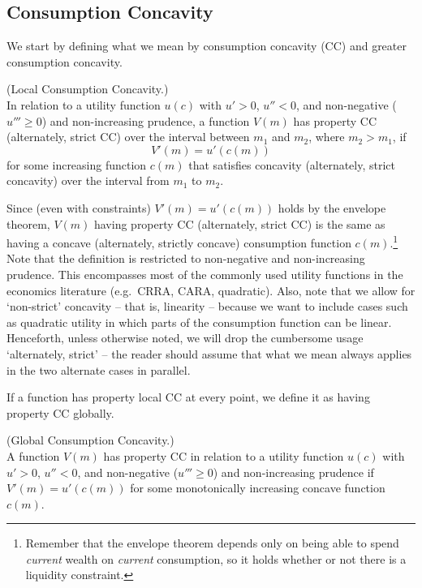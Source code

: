 
  \subsection{Consumption Concavity}\label{sec:def_CC}
  We start by defining what we mean by consumption concavity (CC) and greater consumption concavity.

  \begin{defn}\label{defn:IntervalStrictCC} (Local Consumption Concavity.) \\ In relation to a
    utility function $u(c)$ with $u'>0$, $u''<0$, and non-negative ($u''' \geq 0$) and non-increasing prudence, a function $V({m})$ has property CC (alternately, strict CC) over the
    interval between ${m}_{1}$ and ${m}_{2}$, where ${m}_2 >{m}_{1}$, if
    \[
      V'({m}) = u'(c({m}))
    \]
    for some increasing function $c({m})$ that satisfies concavity (alternately, strict concavity) over the interval from ${m}_{1}$ to ${m}_{2}$.
  \end{defn}
  \noindent Since (even with constraints) $V'({m}) = u'(c({m}))$ holds by the envelope theorem, $V({m})$ having property CC (alternately, strict CC) is the same as having a concave (alternately, strictly concave) consumption function $c({m})$.\footnote{Remember that the envelope theorem depends only on being able to spend \textit{current} wealth on \textit{current} consumption, so it holds whether or not there is a 	liquidity constraint.} Note that the definition is restricted to non-negative and non-increasing prudence. This encompasses most of the commonly used utility functions in the economics literature (e.g.\ CRRA, CARA, quadratic). Also, note that we allow for `non-strict' concavity -- that is, linearity -- because we want to include cases such as quadratic utility in which parts of the consumption function can be linear.  Henceforth, unless otherwise noted, we will drop the cumbersome usage `alternately, strict' -- the reader should assume that what we mean always applies in the two alternate cases in parallel.

  If a function has property local CC at every point, we define it as having property CC globally.
  \begin{defn}\label{defn:PropCC} (Global Consumption Concavity.) \\  A function $V({m})$ has property CC in relation to a utility function $u(c)$ with $u'>0$, $u''<0$, and non-negative ($u''' \geq 0$) and non-increasing prudence if $V'({m}) = u'(c({m}))$ for some monotonically increasing concave function $c({m})$.
  \end{defn}

